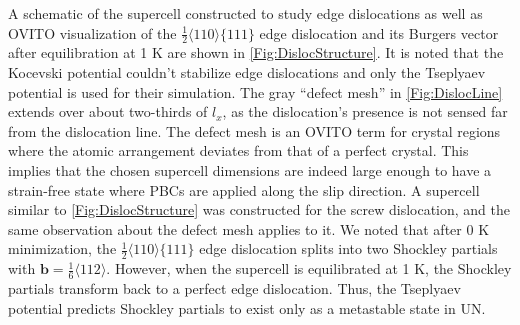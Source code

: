 \documentclass[applsci,article,submit,pdftex,moreauthors]{Definitions/mdpi}
\newcommand{\?}{\stackrel{?}{=}}
\begin{document}
A schematic of the supercell constructed to study edge dislocations as well as OVITO visualization of the $\frac{1}{2} \langle 110 \rangle \{111\}$ edge dislocation and its Burgers vector after equilibration at 1 K are shown in \cref{Fig:DislocStructure}. It is noted that the Kocevski potential couldn't stabilize edge dislocations and only the Tseplyaev potential is used for their simulation. The gray ``defect mesh'' in \cref{Fig:DislocLine} extends over about two-thirds of $l_x$, as the dislocation's presence is not sensed far from the dislocation line. The defect mesh is an OVITO term for crystal regions where the atomic arrangement deviates from that of a perfect crystal. This implies that the chosen supercell dimensions are indeed large enough to have a strain-free state where PBCs are applied along the slip direction. A supercell similar to \cref{Fig:DislocStructure} was constructed for the screw dislocation, and the same observation about the defect mesh applies to it. We noted that after 0 K minimization, the $\frac{1}{2} \langle 110 \rangle \{111\}$ edge dislocation splits into two Shockley partials with $\mathbf{b} = \frac{1}{6} \langle 112 \rangle$. However, when the supercell is equilibrated at 1 K, the Shockley partials transform back to a perfect edge dislocation. Thus, the Tseplyaev potential predicts Shockley partials to exist only as a metastable state in UN. %
\end{document}
